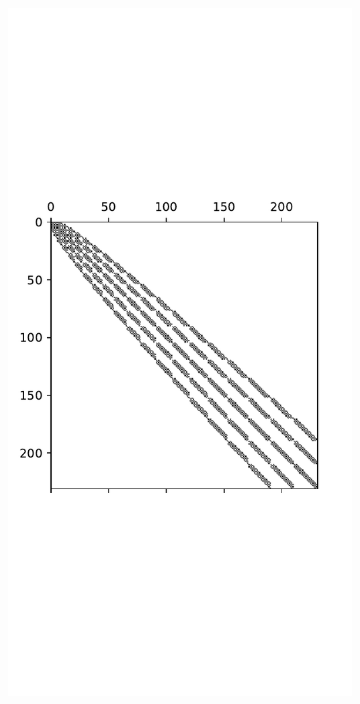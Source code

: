 \documentclass[11pt, oneside]{article}   	%
\begin{document}
\begin{figure}[t]
	\begin{subfigure}{0.32\textwidth}
	\includegraphics[scale=0.35]{sparsityoflaplacian-w11-diskslice-alpha=0p2-beta=0p8}
        \centering
	\end{subfigure}

\end{figure}
\end{document}
